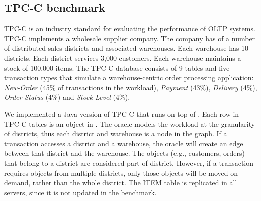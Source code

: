 
\subsection{TPC-C benchmark}
\label{sec:imp:tpcc}


TPC-C is an industry standard for evaluating the performance of OLTP systems.
TPC-C implements a wholesale supplier company. The company has of a number of
distributed sales districts and associated warehouses. Each warehouse has 10
districts. Each district services 3,000 customers. Each warehouse maintains a
stock of 100,000 items. The TPC-C database consists of 9 tables and five
transaction types that simulate a warehouse-centric order processing
application: \emph{New-Order} (45\% of transactions in the workload),
\emph{Payment} (43\%), \emph{Delivery} (4\%), \emph{Order-Status} (4\%) and
\emph{Stock-Level} (4\%).

We implemented a Java version of TPC-C that runs on top of \dynastar. Each row
in TPC-C tables is an object in \dynastar. The oracle models the workload at the
granularity of districts, thus each district and warehouse is a node in the
graph. If a transaction accesses a district and a warehouse, the oracle will
create an edge between that district and the warehouse. The objects (e.g.,
customers, orders) that belong to a district are considered part of district.
However, if a transaction requires objects from multiple districts, only those
objects will be moved on demand, rather than the whole district. The ITEM table
is replicated in all servers, since it is not updated in the benchmark.

